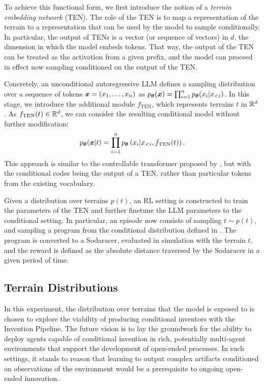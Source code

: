 \documentclass{article}
\begin{document}
To achieve this functional form, we first introduce the notion of a \emph{terrain embedding network} (TEN). The role of the TEN is to map a representation of the terrain to a representation that can be used by the model to sample conditionally. In particular, the output of TENs is a vector (or sequence of vectors) in $d$, the dimension in which the model embeds tokens. That way, the output of the TEN can be treated as the activation from a given prefix, and the model can proceed in effect now sampling conditioned on the output of the TEN.

Concretely, an unconditional autoregressive LLM defines a sampling distribution over a sequence of tokens ${\bm{x}} = (x_1, \hdots, x_n)$ as $p_{\bm{\theta}}({\bm{x}}) = \prod_{i=1}^{n} p_{\bm{\theta}}(x_i | x_{<i})$. In this stage, we introduce the additional module $f_{\text{TEN}}$, which represents terrains $t$ in ${\mathbb{R}}^d$. As $f_{\text{TEN}}(t) \in {\mathbb{R}}^d$, we can consider the resulting conditional model without further modification: 
\begin{equation}
\label{eqn:conditionalLM}
    p_{\bm{\theta}}({\bm{x}} | t) = \prod_{i=1}^{n} p_{\bm{\theta}} \left( x_i | x_{<i}, f_{\text{TEN}}(t) \right). 
\end{equation}
This approach is similar to the controllable transformer proposed by \citet{keskar2019ctrl}, but with the conditional codes being the output of a TEN, rather than particular tokens from the existing vocabulary. 

Given a distribution over terrains $p(t)$, an RL setting is constructed to train the parameters of the TEN and further finetune the LLM parameters to the conditional setting. In particular, an episode now consists of sampling $t \sim p(t)$, and sampling a program from the conditional distribution defined in . The program is converted to a Sodaracer, evaluated in simulation with the terrain $t$, and the reward is defined as the absolute distance traversed by the Sodaracer in a given period of time. 


\subsection{Terrain Distributions}
\label{sec:terrain-distributions}
In this experiment, the distribution over terrains that the model is exposed to is chosen to explore the viability of producing conditional inventors with the Invention Pipeline. The future vision is to lay the groundwork for the ability to deploy agents capable of conditional invention in rich, potentially multi-agent environments that support the development of open-ended processes. In such settings, it stands to reason that learning to output complex artifacts conditioned on observations of the environment would be a prerequisite to ongoing open-ended innovation. 
\end{document}
